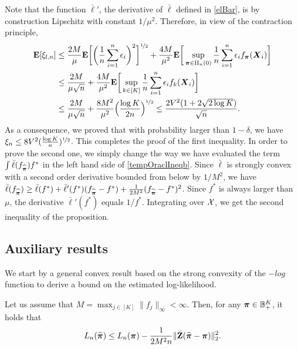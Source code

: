 Note that the function $\bar\ell'$, the derivative of $\bar\ell$ defined in \eqref{elBar},
is by construction Lipschitz with constant $1/\mu^2$. Therefore, in view of the contraction
principle,
\begin{align}
\mathbf E[\xi_{l,n}]
&\le \frac{2M}{\mu}\mathbf E\bigg[\bigg(\frac1n\sum_{i=1}^n \epsilon_i\bigg)^2\bigg]^{\nicefrac12}+
\frac{4M}{\mu^2}\mathbf E\bigg[\sup_{\boldsymbol \pi\in\Pi_n(0)} \frac1n\sum_{i=1}^n
\epsilon_if_{\boldsymbol \pi}(\boldsymbol X_i)\bigg]\\
&\le \frac{2M}{\mu\sqrt{n}}+
\frac{4M}{\mu^2}\mathbf E\bigg[\sup_{k\in[K]} \frac1n\sum_{i=1}^n
\epsilon_i f_k(\boldsymbol X_i)\bigg]\\
&\le \frac{2M}{\mu\sqrt{n}}+
\frac{8M^2}{\mu^2}\Big(\frac{\log K}{2n}\Big)^{\nicefrac12} \le \frac{2V^2(1+2\sqrt{2\log K})}{\sqrt{n}}.
\end{align}
As a consequence, we proved that with probability larger than $1-\delta$, we have
$\xi_n\le 8V^2(\frac{\log K}{n})^{\nicefrac12}$. This completes the proof of the first inequality.
In order to prove the second one, we simply change the way we have evaluated the term
$\int \bar\ell(f_{\widehat{\boldsymbol \pi}})f^*$ in the left hand side of \eqref{tempOraclIneqb}. Since
$\bar\ell$ is strongly convex with a second order derivative bounded from below by $1/M^2$, we
have $\bar\ell(f_{\widehat{\boldsymbol \pi}})\ge \bar\ell(f^*) + \bar\ell'(f^*)(f_{\widehat{\boldsymbol \pi}}-f^*)+
\frac1{2M^2}(f_{\widehat{\boldsymbol \pi}}-f^*)^2$. Since $f^*$ is always larger than $\mu$, the derivative
$\bar\ell'(f^*)$ equals $1/f^*$. Integrating over $\mathcal X$, we get the second inequality of
the proposition.


\subsection{Auxiliary results}\label{ssec:auxiliary}


We start by a general convex result based on the strong convexity of the $-log$ function to
derive a bound on the estimated log-likelihood.
\begin{lemma}{}
	\label{convexlemma}
	Let us assume that $M =\max_{j\in[K]}\|f_j\|_\infty<\infty$. Then, for any $\boldsymbol \pi\in {\mathbb B}^K_+$, it holds that
	\begin{equation}
	L_n(\widehat{\boldsymbol \pi}) \le L_n(\boldsymbol \pi) -\frac1{2M^2n}\|\bar{\mathbf Z}(\widehat{\boldsymbol \pi}-\boldsymbol \pi)\|_2^2.
	\end{equation}
\end{lemma}

